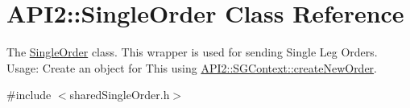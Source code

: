 \hypertarget{class_a_p_i2_1_1_single_order}{\section{A\-P\-I2\-:\-:Single\-Order Class Reference}
\label{class_a_p_i2_1_1_single_order}
}


The \hyperlink{class_a_p_i2_1_1_single_order}{Single\-Order} class. This wrapper is used for sending Single Leg Orders. Usage\-: Create an object for This using \hyperlink{class_a_p_i2_1_1_s_g_context_ab141f05e2a0d8a51fdadc57bf53d2cd8}{A\-P\-I2\-::\-S\-G\-Context\-::create\-New\-Order}.  




{\ttfamily \#include $<$shared\-Single\-Order.\-h$>$}


